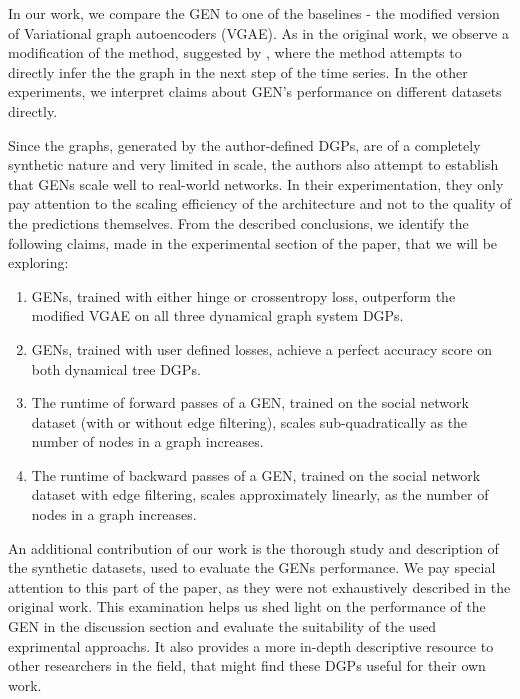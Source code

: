 In our work, we compare the GEN to one of the baselines - the modified version of Variational graph autoencoders (VGAE). As in the original work, we observe a modification of the method, suggested by \cite{VGRNN}, where the method attempts to directly infer the the graph in the next step of the time series. In the other experiments, we interpret claims about GEN's performance on different datasets directly.


Since the graphs, generated by the author-defined DGPs, are of a completely synthetic nature and very limited in scale, the authors also attempt to establish that GENs scale well to real-world networks. In their experimentation, they only pay attention to the scaling efficiency of the architecture and not to the quality of the predictions themselves. From the described conclusions, we identify the following claims, made in the experimental section of the paper, that we will be exploring:

\begin{enumerate}[label=\textbf{Claim} (\roman*):,leftmargin=*,align=left]
    \item GENs, trained with either hinge or crossentropy loss, outperform the modified VGAE on all three dynamical graph system DGPs.
    
    \item GENs, trained with user defined losses, achieve a perfect accuracy score on both dynamical tree DGPs.
    
    \item The runtime of forward passes of a GEN, trained on the social network dataset (with or without edge filtering), scales sub-quadratically as the number of nodes in a graph increases.
    \item The runtime of backward passes of a GEN, trained on the social network dataset  with edge filtering, scales approximately linearly, as the number of nodes in a graph increases.
\end{enumerate}

An additional contribution of our work is the thorough study and description of the synthetic datasets, used to evaluate the GENs performance. We pay special attention to this part of the paper, as they were not exhaustively described in the original work. This examination helps us shed light on the performance of the GEN in the discussion section and evaluate the suitability of the used exprimental approachs. It also provides a more in-depth descriptive resource to other researchers in the field, that might find these DGPs useful for their own work.

